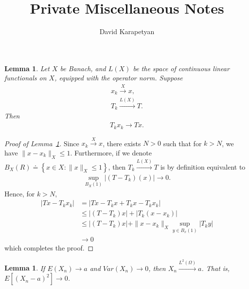 \documentclass[12pt,reqno]{amsart}
\numberwithin{equation}{section}  %
\newtheorem{lemma}[theorem]{Lemma}
\begin{document}
\title{Private Miscellaneous Notes}
\author{David Karapetyan}
        \maketitle
        \section{}
        \label{sec:ll}
        
\begin{lemma}
Let $X$ be Banach, and $L(X)$ be the space of continuous linear functionals on
$X$, equipped with the operator norm. Suppose 
%
%
\begin{gather*}
  x_{k} \xrightarrow{X} x,
  \\
  T_{k} \xrightarrow{L(X)} T.
\end{gather*}
%
%
Then
\begin{gather*}
  T_{k} x_{k} \to Tx.
\end{gather*}
%
\label{lem:diag}
\end{lemma}
%
%
\begin{proof}[Proof of Lemma~\ref{lem:diag}]
  Since $x_{k} \xrightarrow{X} x$, there exists $N > 0$ such that for $k > N$,
  we have $\|x -x_{k} \|_{X} \le 1$. Furthermore, if we denote $B_{X}(R) \doteq
  \left\{ x \in X: \| x \|_{X} \le 1 \right\}$, then $T_{k}
  \xrightarrow{L(X)} T$ is by definition equivalent to 
  \begin{equation*}
  \begin{split}
    \sup_{B_{X}(1)}  | (T - T_{k})(x) | \to 0.
  \end{split}
  \end{equation*}
  Hence, for $k > N$, 
  \begin{equation*}
  \begin{split}
    | Tx - T_{k}x_{k} |
    & = | Tx - T_{k}x + T_{k}x - T_{k}x_{k} |
    \\
    & \le | (T - T_{k})x | + | T_{k}(x -x_{k}) |
    \\
    & \le | (T - T_{k})x |
    + \| x - x_{k}\|_{X} \sup_{y \in B_{x}(1)} | T_{k}y |
    \\
    & \to 0
  \end{split}
  \end{equation*}
  which completes the proof.
\end{proof}

\begin{lemma}
If $E(X_{n}) \to a$ and $Var(X_{n}) \to 0$, then $X_{n} \xrightarrow{L^{2}(\Omega)}a$. That is, \\ $E[(X_{n} -a)^{2}] \to 0$.
\label{lem:}
\end{lemma}
\end{document}
